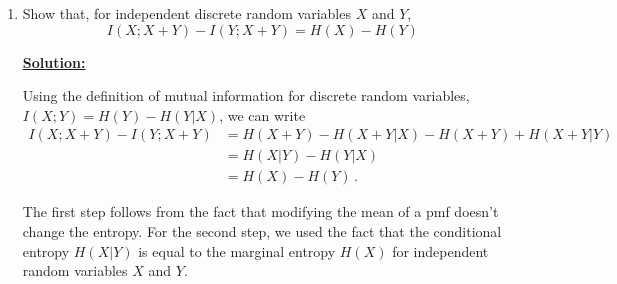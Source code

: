 \documentclass[a4paper]{article}
\begin{document}
{\begin{enumerate}
{\begin{align*}
H(Y) &= -\sum_y p_Y(y) \log_2 p_Y(y) \\
 &= -2\cdot \frac{1}{12}\log_2 \frac{1}{12} - 5\cdot \frac{1}{6}\log_2 \frac{1}{6} \\
 &= \frac{1}{6}\cdot\left( \log_2 4 + \log_2 3 \right) + \frac{5}{6}\cdot \left( \log_2 2 + \log_2 3 \right) \\
 &= \frac{7}{6} + \log_2 3
\end{align*}


We can determine the conditional entropies using
$$
H(X|Y) = H(X,Y) - H(Y) =2 + \log_2 3-\frac{7}{6}-\log_2 3 = \frac{5}{6} 
$$

$$
H(Y|X) = H(X,Y) - H(X) =2 + \log_2 3-\frac{7}{6}-\log_2 3 = \frac{5}{6} 
$$

The mutual information $I(X;Y)$ can be determined acording to
$$
I(X;Y) = H(X) - H(X|Y) = \frac{7}{6} + \log_2 3 - \frac{5}{6} = \frac{1}{3} + \log_2 3
$$
or
$$
I(X;Y) = H(Y) - H(Y|X) = \frac{7}{6} + \log_2 3 - \frac{5}{6} = \frac{1}{3} + \log_2 3
$$
}

\item{Show that, for independent discrete random variables $X$ and $Y$,
$$
I(X;X+Y) - I(Y;X+Y) = H(X) - H(Y)
$$

\underline{\textbf{Solution:}}


Using the definition of mutual information for discrete random variables, $I(X;Y) = H(Y)- H(Y|X)$, we can write
\begin{align*}
 I(X;X+Y) - I(Y;X+Y) &= H(X+Y)-H(X+Y|X) - H(X+Y)+H(X+Y|Y) \\
 &= H(X|Y) - H(Y|X) \\
 &= H(X) - H(Y)\,.
\end{align*}

The first step follows from the fact that modifying the mean of a pmf doesn't change the entropy. For the second step, we used the fact that the conditional entropy $H(X|Y)$ is equal to the marginal entropy $H(X)$ for independent random variables $X$ and $Y$.

}



\end{enumerate}
}
\end{document}
